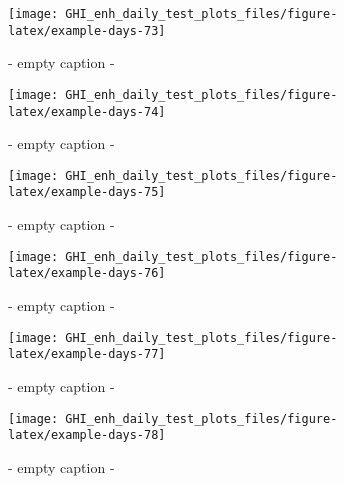 \documentclass[
  10pt,
  a4paper,oneside]{article}
\begin{document}
\begin{figure}[H]

{\centering \texttt{[image: GHI\_enh\_daily\_test\_plots\_files/figure-latex/example-days-73]} 

}

\caption{ - empty caption - }\label{fig:example-days-73}
\end{figure}

\begin{figure}[H]

{\centering \texttt{[image: GHI\_enh\_daily\_test\_plots\_files/figure-latex/example-days-74]} 

}

\caption{ - empty caption - }\label{fig:example-days-74}
\end{figure}

\begin{figure}[H]

{\centering \texttt{[image: GHI\_enh\_daily\_test\_plots\_files/figure-latex/example-days-75]} 

}

\caption{ - empty caption - }\label{fig:example-days-75}
\end{figure}

\begin{figure}[H]

{\centering \texttt{[image: GHI\_enh\_daily\_test\_plots\_files/figure-latex/example-days-76]} 

}

\caption{ - empty caption - }\label{fig:example-days-76}
\end{figure}

\begin{figure}[H]

{\centering \texttt{[image: GHI\_enh\_daily\_test\_plots\_files/figure-latex/example-days-77]} 

}

\caption{ - empty caption - }\label{fig:example-days-77}
\end{figure}

\begin{figure}[H]

{\centering \texttt{[image: GHI\_enh\_daily\_test\_plots\_files/figure-latex/example-days-78]} 

}

\caption{ - empty caption - }\label{fig:example-days-78}
\end{figure}
\end{document}
